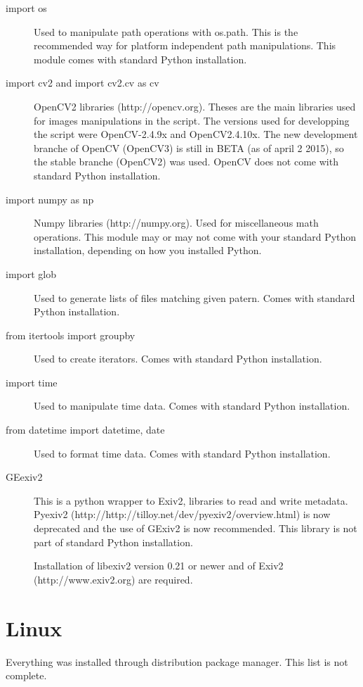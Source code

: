 \documentclass[a4paper, 11pt]{article}
\begin{document}
\begin{description}
\item [import os]
Used to manipulate path operations with os.path. This is the recommended way for platform independent path manipulations. This module comes with standard Python installation.

\item [import cv2 and import cv2.cv as cv]

OpenCV2 libraries (http://opencv.org). Theses are the main libraries used for images manipulations in the script. The versions used for developping the script were OpenCV-2.4.9x and OpenCV2.4.10x. The new development branche of OpenCV (OpenCV3) is still in BETA (as of april 2 2015), so the stable branche (OpenCV2) was used. OpenCV does not come with standard Python installation.

\item [import numpy as np] Numpy libraries (http://numpy.org). Used for miscellaneous math operations. This module may or may not come with your standard Python installation, depending on how you installed Python.

\item[import glob] Used to generate lists of files matching given patern. Comes with standard Python installation.

\item [from itertools import groupby] Used to create iterators. Comes with standard Python installation.

\item [import time] Used to manipulate time data. Comes with standard Python installation.

\item [from datetime import datetime, date] Used to format time data. Comes with standard Python installation.

\item [GEexiv2] This is a python wrapper to Exiv2, libraries to read and write metadata. Pyexiv2 (http://http://tilloy.net/dev/pyexiv2/overview.html) is now deprecated and the use of GExiv2 is now recommended. This library is not part of standard Python installation. 

Installation of libexiv2 version 0.21 or newer and of Exiv2 (http://www.exiv2.org) are required.

\end{description}

\section{Linux}
Everything was installed through distribution package manager. This list is not complete.
\end{document}

